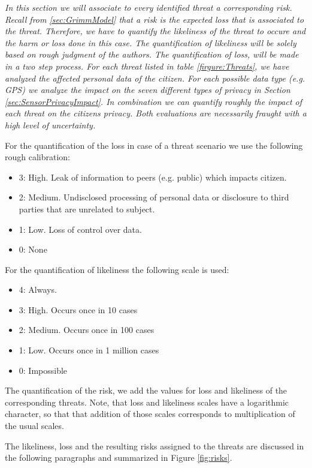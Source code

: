 \documentclass[runningheads,a4paper]{llncs}
\newenvironment{LGContent}
{ \par\color{blue} \it \small }
{ \par }
\begin{document}
\begin{LGContent}
In this section we will associate to every identified threat a corresponding risk.
Recall from \ref{sec:GrimmModel} that a risk is the expected loss that is associated to the threat.
Therefore, we have to quantify the likeliness of the threat to occure and the harm or loss done in this case.
The quantification of likeliness will be solely based on rough judgment of the authors.
The quantification of loss, will be made in a two step process.
For each threat listed in table \ref{firgure:Threats}, we have analyzed the affected personal data of the citizen.
For each possible data type (e.g. GPS) we analyze the impact on the seven different types of privacy in Section \ref{sec:SensorPrivacyImpact}.
In combination we can quantify roughly the impact of each threat on the citizens privacy. Both evaluations are necessarily fraught with a high level of uncertainty.

For the quantification of the loss in case of a threat scenario we use the following rough calibration:
\begin{itemize}
\item 3: High. Leak of information to peers (e.g. public) which impacts citizen.
\item 2: Medium. Undisclosed processing of personal data or disclosure to third parties that are unrelated to subject.
\item 1: Low. Loss of control over data.
\item 0: None
\end{itemize}

For the quantification of likeliness the following scale is used:
\begin{itemize}
\item 4: Always.
\item 3: High. Occurs once in 10 cases
\item 2: Medium. Occurs once in 100 cases
\item 1: Low. Occurs once in 1 million cases
\item 0: Impossible
\end{itemize}

The quantification of the risk, we add the values for loss and
likeliness of the corresponding threats. Note, that loss and
likeliness scales have a logarithmic character, so that that addition
of those scales corresponds to multiplication of the usual scales.


The likeliness, loss and the resulting risks assigned to the threats
are discussed in the following paragraphs and summarized in Figure
\ref{fig:risks}.



\end{LGContent}
\end{document}
